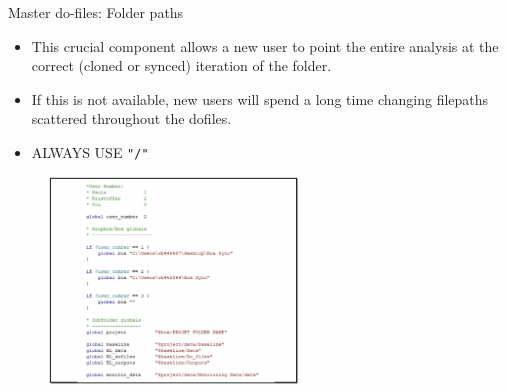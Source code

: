 \documentclass[aspectratio=169]{beamer}
\begin{document}
\begin{frame}[fragile]{Master do-files: Folder paths}
\begin{multicols}{2}	
	
	\begin{itemize}[<default overlay specification>]
		\item<1> This crucial component allows a new user to point the entire analysis at the correct (cloned or synced) iteration of the folder.
		\item<1> If this is not available, new users will spend a long time changing filepaths scattered throughout the dofiles.
		\item<1>  ALWAYS USE \texttt{"/"} 
	\end{itemize}
	
	\begin{figure}
		\centering
		\includegraphics[height=55mm]{img/Structure15}
	\end{figure}
	
\end{multicols}
\end{frame}
\end{document}
